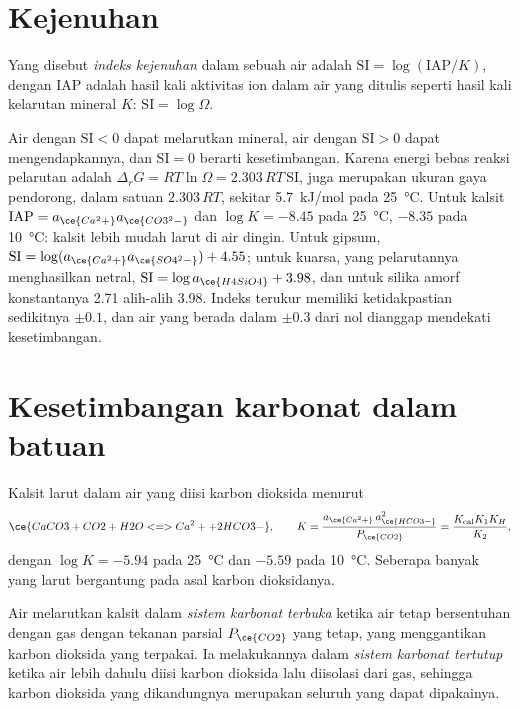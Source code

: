 \section{Kejenuhan}\label{sec:b3:water-rock-interaction:saturation}

\begin{definition}\label{def:b3:water-rock-interaction:si}
Yang disebut \emph{indeks kejenuhan}
dalam sebuah air adalah $\mathrm{SI} = \log(\mathrm{IAP}/K)$, dengan IAP
adalah hasil kali aktivitas ion dalam air yang ditulis seperti hasil kali
kelarutan mineral $K$: $\mathrm{SI} = \log\Omega$.
\end{definition}

Air dengan $\mathrm{SI} < 0$ dapat melarutkan mineral, air dengan
$\mathrm{SI} > 0$ dapat mengendapkannya, dan $\mathrm{SI} = 0$ berarti kesetimbangan.
Karena energi bebas reaksi pelarutan adalah $\Delta_r G = RT\ln\Omega
= 2.303\,RT\,\mathrm{SI}$,  juga merupakan ukuran gaya pendorong,
dalam satuan $2.303\,RT$, sekitar \qty{5.7}{kJ/mol} pada
\qty{25}{\celsius}. Untuk kalsit $\mathrm{IAP} = a_{\ce{Ca^2+}}
a_{\ce{CO3^2-}}$ dan $\log K = -8.45$ pada \qty{25}{\celsius}, $-8.35$ pada
\qty{10}{\celsius}: kalsit lebih mudah larut di air dingin. Untuk gipsum, $\mathrm{SI} = \log(a_{\ce{Ca^2+}}a_{\ce{SO4^2-}}) + 4.55$;
untuk kuarsa, yang pelarutannya menghasilkan  netral, $\mathrm{SI} = \log
a_{\ce{H4SiO4}} + 3.98$, dan untuk silika amorf konstantanya 2.71
alih-alih 3.98. Indeks terukur memiliki ketidakpastian sedikitnya $\pm0.1$,
dan air yang berada dalam $\pm0.3$ dari nol dianggap mendekati kesetimbangan.

\section{Kesetimbangan karbonat dalam batuan}\label{sec:b3:water-rock-interaction:carbonate}

Kalsit larut dalam air yang diisi karbon dioksida menurut
\[
\ce{CaCO3 + CO2 + H2O <=> Ca^2+ + 2 HCO3-},
\qquad K = \frac{a_{\ce{Ca^2+}}\,a_{\ce{HCO3-}}^2}{P_{\ce{CO2}}}
= \frac{K_{\mathrm{cal}}K_1K_H}{K_2},
\]
dengan $\log K = -5.94$ pada \qty{25}{\celsius} dan $-5.59$ pada \qty{10}{\celsius}.
Seberapa banyak yang larut bergantung pada asal karbon dioksidanya.

\begin{definition}\label{def:b3:water-rock-interaction:open-closed}
Air melarutkan kalsit dalam \emph{sistem karbonat terbuka}
ketika air tetap bersentuhan dengan gas dengan tekanan parsial
$P_{\ce{CO2}}$ yang tetap, yang menggantikan karbon dioksida yang terpakai. Ia melakukannya dalam
\emph{sistem karbonat tertutup} ketika air
lebih dahulu diisi karbon dioksida lalu diisolasi dari gas, sehingga
karbon dioksida yang dikandungnya merupakan seluruh yang dapat dipakainya.
\end{definition}

